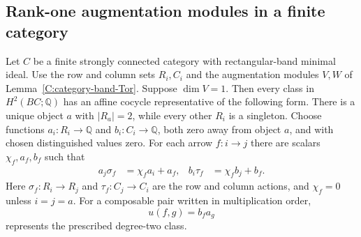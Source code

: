 \subsection{Rank-one augmentation modules in a finite category}

\begin{lemma}
\label{C:category-affine-balanced}
Let $C$ be a finite strongly connected category with rectangular-band
minimal ideal.  Use the row and column sets $R_i,C_i$ and the
augmentation modules $V,W$ of Lemma~\ref{C:category-band-Tor}.
Suppose $\dim V=1$.  Then every class in $H^2(BC;\mathbb Q)$ has
an affine cocycle representative of the following form.  There is a
unique object $a$ with $|R_a|=2$, while every other $R_i$ is a
singleton.  Choose functions $a_i:R_i\to\mathbb Q$ and
$b_i:C_i\to\mathbb Q$, both zero away from object $a$, and with
chosen distinguished values zero.  For each arrow $f:i\to j$ there
are scalars $\chi_f,a_f,b_f$ such that
\begin{align*}
 a_j\sigma_f&=\chi_f a_i+a_f,&
 b_i\tau_f&=\chi_f b_j+b_f.
\end{align*}
Here $\sigma_f:R_i\to R_j$ and $\tau_f:C_j\to C_i$ are the
row and column actions, and $\chi_f=0$ unless $i=j=a$.
For a composable pair written in multiplication order,
\[
 u(f,g)=b_fa_g
\]
represents the prescribed degree-two class.
\end{lemma}
